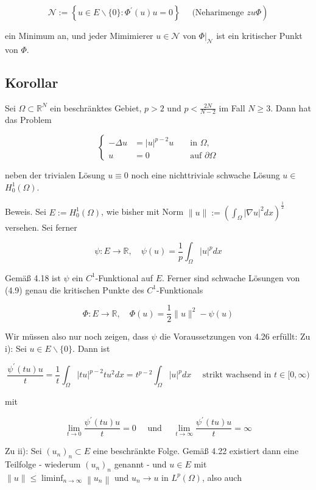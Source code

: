 \documentclass[10pt, letterpaper]{article}
\begin{document}
$$
\left.\mathcal{N}:=\left\{u \in E \backslash\{0\}: \Phi^{\prime}(u) u=0\right\} \quad \text { (Neharimenge } z u \Phi\right)
$$

ein Minimum an, und jeder Mimimierer $u \in \mathcal{N}$ von $\left.\Phi\right|_{\mathcal{N}}$ ist ein kritischer Punkt von $\Phi$.

\subsection*{Korollar}

Sei $\Omega \subset \mathbb{R}^{N}$ ein beschränktes Gebiet, $p>2$ und $p<\frac{2 N}{N-2}$ im Fall $N \geq 3$. Dann hat das Problem

$$
\left\{\begin{aligned}
-\Delta u & =|u|^{p-2} u & & \text { in } \Omega, \\
u & =0 & & \text { auf } \partial \Omega
\end{aligned}\right.
$$

neben der trivialen Lösung $u \equiv 0$ noch eine nichttriviale schwache Lösung $u \in$ $H_{0}^{1}(\Omega)$.

Beweis. Sei $E:=H_{0}^{1}(\Omega)$, wie bisher mit Norm $\|u\|:=\left(\int_{\Omega}|\nabla u|^{2} d x\right)^{\frac{1}{2}}$ versehen. Sei ferner

$$
\psi: E \rightarrow \mathbb{R}, \quad \psi(u)=\frac{1}{p} \int_{\Omega}|u|^{p} d x
$$

Gemäß 4.18 ist $\psi$ ein $C^{1}$-Funktional auf $E$. Ferner sind schwache Lösungen von (4.9) genau die kritischen Punkte des $C^{1}$-Funktionals

$$
\Phi: E \rightarrow \mathbb{R}, \quad \Phi(u)=\frac{1}{2}\|u\|^{2}-\psi(u)
$$

Wir müssen also nur noch zeigen, dass $\psi$ die Voraussetzungen von 4.26 erfüllt: Zu i): Sei $u \in E \backslash\{0\}$. Dann ist

$$
\frac{\psi^{\prime}(t u) u}{t}=\frac{1}{t} \int_{\Omega}|t u|^{p-2} t u^{2} d x=t^{p-2} \int_{\Omega}|u|^{p} d x \quad \text { strikt wachsend in } t \in[0, \infty)
$$

mit

$$
\lim _{t \rightarrow 0} \frac{\psi^{\prime}(t u) u}{t}=0 \quad \text { und } \quad \lim _{t \rightarrow \infty} \frac{\psi^{\prime}(t u) u}{t}=\infty
$$

Zu ii): Sei $\left(u_{n}\right)_{n} \subset E$ eine beschränkte Folge. Gemäß 4.22 existiert dann eine Teilfolge - wiederum $\left(u_{n}\right)_{n}$ genannt - und $u \in E$ mit $\|u\| \leq \liminf _{n \rightarrow \infty}\left\|u_{n}\right\|$ und $u_{n} \rightarrow u$ in $L^{p}(\Omega)$, also auch
\end{document}
